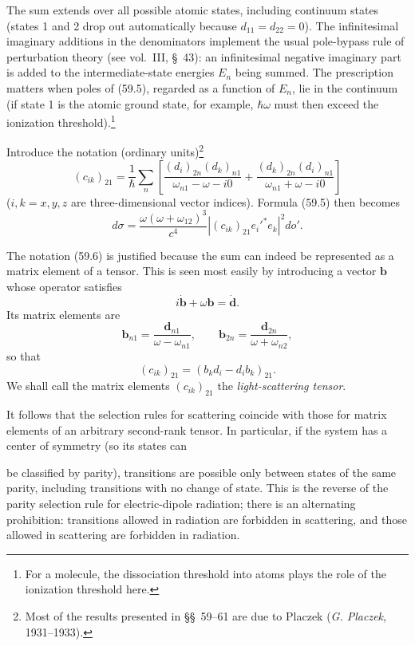 The sum extends over all possible atomic states, including continuum states (states 1 and 2 drop out automatically because $d_{11}=d_{22}=0$). The infinitesimal imaginary additions in the denominators implement the usual pole-bypass rule of perturbation theory (see vol.~III, \S~43): an infinitesimal negative imaginary part is added to the intermediate-state energies $E_n$ being summed. The prescription matters when poles of (59.5), regarded as a function of $E_n$, lie in the continuum (if state 1 is the atomic ground state, for example, $\hbar\omega$ must then exceed the ionization threshold).\footnote{For a molecule, the dissociation threshold into atoms plays the role of the ionization threshold here.}

Introduce the notation (ordinary units)\footnote{Most of the results presented in \S\S~59--61 are due to Placzek (\emph{G. Placzek}, 1931--1933).}
\begin{equation}
(c_{ik})_{21}=\frac1\hbar\sum_n\left[
\frac{(d_i)_{2n}(d_k)_{n1}}{\omega_{n1}-\omega-i0}
+\frac{(d_k)_{2n}(d_i)_{n1}}{\omega_{n1}+\omega-i0}
\right]
\tag{59.6}
\end{equation}
($i,k=x,y,z$ are three-dimensional vector indices). Formula (59.5) then becomes
\begin{equation}
d\sigma=\frac{\omega(\omega+\omega_{12})^3}{c^4}
\left|(c_{ik})_{21}e_i'^*e_k\right|^2do'.
\tag{59.7}
\end{equation}

The notation (59.6) is justified because the sum can indeed be represented as a matrix element of a tensor. This is seen most easily by introducing a vector $\mathbf b$ whose operator satisfies
\[
i\dot{\mathbf b}+\omega\mathbf b=\dot{\mathbf d}.
\]
Its matrix elements are
\[
\mathbf b_{n1}=\frac{\mathbf d_{n1}}{\omega-\omega_{n1}},
\qquad
\mathbf b_{2n}=\frac{\mathbf d_{2n}}{\omega+\omega_{n2}},
\]
so that
\begin{equation}
(c_{ik})_{21}=(b_kd_i-d_ib_k)_{21}.
\tag{59.8}
\end{equation}
We shall call the matrix elements $(c_{ik})_{21}$ the \emph{light-scattering tensor}.

It follows that the selection rules for scattering coincide with those for matrix elements of an arbitrary second-rank tensor. In particular, if the system has a center of symmetry (so its states can

be classified by parity), transitions are possible only between states of the same parity, including transitions with no change of state. This is the reverse of the parity selection rule for electric-dipole radiation; there is an alternating prohibition: transitions allowed in radiation are forbidden in scattering, and those allowed in scattering are forbidden in radiation.

